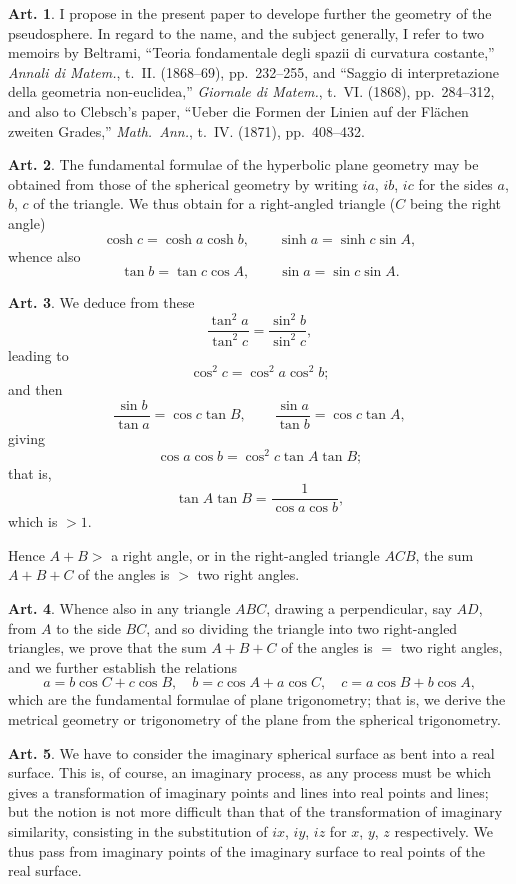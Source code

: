 \documentclass[11pt,a4paper]{article}
\theoremstyle{definition}
\newtheorem{art}{Art.}[section]
\begin{document}
\begin{art}
I propose in the present paper to develope further the geometry of the pseudosphere. In regard to the name, and the subject generally, I refer to two memoirs by Beltrami, ``Teoria fondamentale degli spazii di curvatura costante,'' \textit{Annali di Matem.}, t.~II. (1868--69), pp.~232--255, and ``Saggio di interpretazione della geometria non-euclidea,'' \textit{Giornale di Matem.}, t.~VI. (1868), pp.~284--312, and also to Clebsch's paper, ``Ueber die Formen der Linien auf der Fl\"achen zweiten Grades,'' \textit{Math.~Ann.}, t.~IV. (1871), pp.~408--432.
\end{art}

\begin{art}
The fundamental formulae of the hyperbolic plane geometry may be obtained from those of the spherical geometry by writing $ia$, $ib$, $ic$ for the sides $a$, $b$, $c$ of the triangle. We thus obtain for a right-angled triangle ($C$ being the right angle)
\[
\cosh c = \cosh a \cosh b, \qquad \sinh a = \sinh c \sin A,
\]
whence also
\[
\tan b = \tan c \cos A, \qquad \sin a = \sin c \sin A.
\]
\end{art}

\begin{art}
We deduce from these
\[
\frac{\tan^2 a}{\tan^2 c} = \frac{\sin^2 b}{\sin^2 c},
\]
leading to
\[
\cos^2 c = \cos^2 a \cos^2 b;
\]
and then
\[
\frac{\sin b}{\tan a} = \cos c \tan B, \qquad \frac{\sin a}{\tan b} = \cos c \tan A,
\]
giving
\[
\cos a \cos b = \cos^2 c \tan A \tan B;
\]
that is,
\[
\tan A \tan B = \frac{1}{\cos a \cos b},
\]
which is $> 1$.

Hence $A + B >$ a right angle, or in the right-angled triangle $ACB$, the sum $A + B + C$ of the angles is $>$ two right angles.
\end{art}

\begin{art}
Whence also in any triangle $ABC$, drawing a perpendicular, say $AD$, from $A$ to the side $BC$, and so dividing the triangle into two right-angled triangles, we prove that the sum $A + B + C$ of the angles is $=$ two right angles, and we further establish the relations
\[
a = b\cos C + c\cos B, \quad b = c\cos A + a\cos C, \quad c = a\cos B + b\cos A,
\]
which are the fundamental formulae of plane trigonometry; that is, we derive the metrical geometry or trigonometry of the plane from the spherical trigonometry.
\end{art}

\begin{art}
We have to consider the imaginary spherical surface as bent into a real surface. This is, of course, an imaginary process, as any process must be which gives a transformation of imaginary points and lines into real points and lines; but the notion is not more difficult than that of the transformation of imaginary similarity, consisting in the substitution of $ix$, $iy$, $iz$ for $x$, $y$, $z$ respectively. We thus pass from imaginary points of the imaginary surface to real points of the real surface.
\end{art}
\end{document}

